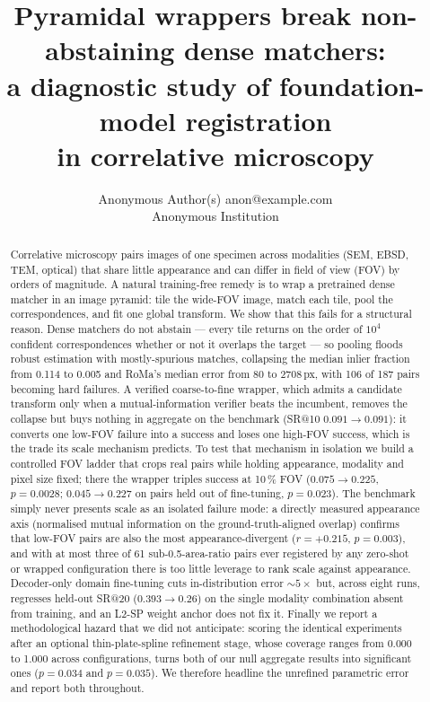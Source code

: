 \documentclass[10pt]{article}
\title{Pyramidal wrappers break non-abstaining dense matchers:\\
a diagnostic study of foundation-model registration\\
in correlative microscopy}
\author{\name Anonymous Author(s) \email anon@example.com \\
      \addr Anonymous Institution}
\begin{document}
\maketitle

\begin{abstract}
Correlative microscopy pairs images of one specimen across modalities (SEM, EBSD, TEM, optical) that share little appearance and can differ in field of view (FOV) by orders of magnitude. A natural training-free remedy is to wrap a pretrained dense matcher in an image pyramid: tile the wide-FOV image, match each tile, pool the correspondences, and fit one global transform. We show that this fails for a structural reason. Dense matchers do not abstain --- every tile returns on the order of $10^4$ confident correspondences whether or not it overlaps the target --- so pooling floods robust estimation with mostly-spurious matches, collapsing the median inlier fraction from 0.114 to 0.005 and RoMa's median error from 80 to 2708\,px, with 106 of 187 pairs becoming hard failures. A verified coarse-to-fine wrapper, which admits a candidate transform only when a mutual-information verifier beats the incumbent, removes the collapse but buys nothing in aggregate on the benchmark (SR@10 $0.091\rightarrow0.091$): it converts one low-FOV failure into a success and loses one high-FOV success, which is the trade its scale mechanism predicts. To test that mechanism in isolation we build a controlled FOV ladder that crops real pairs while holding appearance, modality and pixel size fixed; there the wrapper triples success at 10\,\% FOV ($0.075\rightarrow0.225$, $p=0.0028$; $0.045\rightarrow0.227$ on pairs held out of fine-tuning, $p=0.023$). The benchmark simply never presents scale as an isolated failure mode: a directly measured appearance axis (normalised mutual information on the ground-truth-aligned overlap) confirms that low-FOV pairs are also the most appearance-divergent ($r=+0.215$, $p=0.003$), and with at most three of 61 sub-0.5-area-ratio pairs ever registered by any zero-shot or wrapped configuration there is too little leverage to rank scale against appearance. Decoder-only domain fine-tuning cuts in-distribution error ${\sim}5\times$ but, across eight runs, regresses held-out SR@20 ($0.393\rightarrow0.26$) on the single modality combination absent from training, and an L2-SP weight anchor does not fix it. Finally we report a methodological hazard that we did not anticipate: scoring the identical experiments after an optional thin-plate-spline refinement stage, whose coverage ranges from 0.000 to 1.000 across configurations, turns both of our null aggregate results into significant ones ($p=0.034$ and $p=0.035$). We therefore headline the unrefined parametric error and report both throughout.
\end{abstract}
\end{document}
